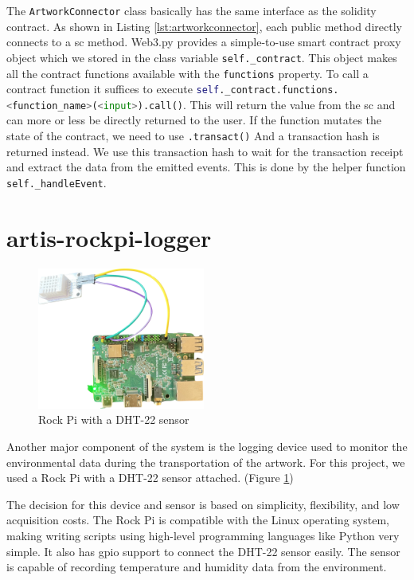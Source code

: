 The \texttt{ArtworkConnector} class basically has the same interface as the solidity contract. As shown in Listing \ref{lst:artworkconnector}, each public method directly connects to a \gls{sc} method. Web3.py provides a simple-to-use smart contract proxy object which we stored in the class variable \texttt{self.\_contract}. This object makes all the contract functions available with the \texttt{functions} property. To call a contract function it suffices to execute \lstinline[language=Python]!self._contract.functions.<function_name>(<input>).call()!.
This will return the value from the \gls{sc} and can more or less be directly returned to the user. If the function mutates the state of the contract, we need to use \lstinline[language=Python]!.transact()! And a transaction hash is returned instead. We use this transaction hash to wait for the transaction receipt and extract the data from the emitted events. This is done by the helper function \texttt{self.\_handleEvent}.



\clearpage
\section{artis-rockpi-logger}
\begin{figure}[h]
    \centering
    \includegraphics[width=0.49\textwidth]{resources/rock-pi.png}
    \caption{Rock Pi with a DHT-22 sensor} 
    \label{fig:rock-pi}
\end{figure}
Another major component of the system is the logging device used to monitor the environmental data during the transportation of the artwork. For this project, we used a Rock Pi \cite{rockpi4} with a DHT-22 \cite{dht22} sensor attached. (Figure \ref{fig:rock-pi})

The decision for this device and sensor is based on simplicity, flexibility, and low acquisition costs. The Rock Pi is compatible with the Linux operating system, making writing scripts using high-level programming languages like Python very simple. It also has \gls{gpio} support to connect the DHT-22 sensor easily. The sensor is capable of recording temperature and humidity data from the environment.

